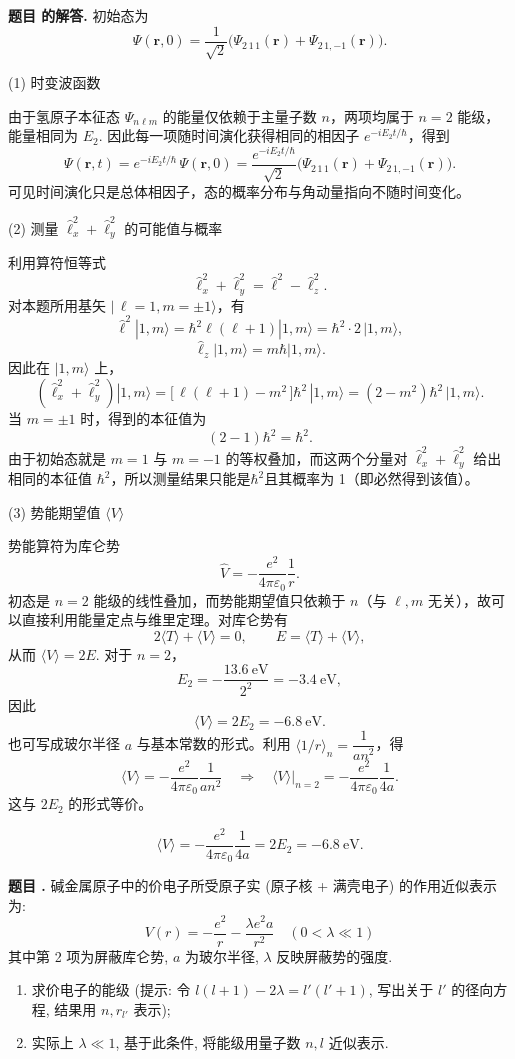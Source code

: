 \documentclass[12pt, a4paper, oneside]{ctexart}
\newcounter{problemname}
\newenvironment{problem}
  {\begin{shaded}\stepcounter{problemname}\par\noindent\textbf{题目 \theproblemname. }}
  {\end{shaded}\par}
\newenvironment{solution}
  {\par\noindent\textbf{题目 \theproblemname 的解答. }}
  {\par}
\begin{document}
\begin{solution}
  初始态为
\[
\Psi(\mathbf r,0)=\frac{1}{\sqrt{2}}\bigl(\Psi_{2\,1\,1}(\mathbf r)+\Psi_{2\,1,-1}(\mathbf r)\bigr).
\]

(1) 时变波函数

由于氢原子本征态 $\Psi_{n\ell m}$ 的能量仅依赖于主量子数 $n$，两项均属于 $n=2$ 能级，能量相同为 $E_2$. 因此每一项随时间演化获得相同的相因子 $e^{-iE_2 t/\hbar}$，得到
\[
\Psi(\mathbf r,t)=e^{-iE_2 t/\hbar}\,\Psi(\mathbf r,0)
=\frac{e^{-iE_2 t/\hbar}}{\sqrt{2}}\bigl(\Psi_{2\,1\,1}(\mathbf r)+\Psi_{2\,1,-1}(\mathbf r)\bigr).
\]
可见时间演化只是总体相因子，态的概率分布与角动量指向不随时间变化。

(2) 测量 $\hat{\ell}_x^2+\hat{\ell}_y^2$ 的可能值与概率

利用算符恒等式
\[
\hat{\ell}_x^2+\hat{\ell}_y^2=\hat{\ell}^2-\hat{\ell}_z^2.
\]
对本题所用基矢 $|\,\ell=1,m=\pm1\rangle$，有
\[
\hat{\ell}^2|1,m\rangle=\hbar^2\ell(\ell+1)|1,m\rangle=\hbar^2\cdot 2\,|1,m\rangle,
\]
\[
\hat{\ell}_z|1,m\rangle=m\hbar|1,m\rangle.
\]
因此在 $|1,m\rangle$ 上，
\[
(\hat{\ell}_x^2+\hat{\ell}_y^2)|1,m\rangle
=\bigl[\,\ell(\ell+1)-m^2\,\bigr]\hbar^2\,|1,m\rangle
=(2-m^2)\hbar^2\,|1,m\rangle.
\]
当 $m=\pm1$ 时，得到的本征值为
\[
(2-1)\hbar^2=\hbar^2.
\]
由于初始态就是 $m=1$ 与 $m=-1$ 的等权叠加，而这两个分量对 $\hat{\ell}_x^2+\hat{\ell}_y^2$ 给出相同的本征值 $\hbar^2$，所以测量结果只能是$\hbar^2$且其概率为 1（即必然得到该值）。

(3) 势能期望值 $\langle V\rangle$

势能算符为库仑势
\[
\hat V=-\frac{e^2}{4\pi\varepsilon_0}\frac{1}{r}.
\]
初态是 $n=2$ 能级的线性叠加，而势能期望值只依赖于 $n$（与 $\ell,m$ 无关），故可以直接利用能量定点与维里定理。对库仑势有
\[
2\langle T\rangle+\langle V\rangle=0,\qquad E=\langle T\rangle+\langle V\rangle,
\]
从而 $\langle V\rangle=2E$. 对于 $n=2$，
\[
E_2=-\frac{13.6\ \mathrm{eV}}{2^2}=-3.4\ \mathrm{eV},
\]
因此
\[
\boxed{\langle V\rangle=2E_2=-6.8\ \mathrm{eV}}.
\]
也可写成玻尔半径 $a$ 与基本常数的形式。利用 $\langle 1/r\rangle_{n}=\dfrac{1}{a n^2}$，得
\[
\langle V\rangle=-\frac{e^2}{4\pi\varepsilon_0}\frac{1}{a n^2}
\quad\Rightarrow\quad
\langle V\rangle\big|_{n=2}=-\frac{e^2}{4\pi\varepsilon_0}\frac{1}{4a}.
\]
这与 $2E_2$ 的形式等价。

\[
\boxed{\langle V\rangle=-\dfrac{e^2}{4\pi\varepsilon_0}\dfrac{1}{4a} = 2E_2 = -6.8\ \mathrm{eV}.}
\]
\end{solution}

\begin{problem}
  碱金属原子中的价电子所受原子实 (原子核 + 满壳电子) 的作用近似表示为:
$$ V(r) = - \frac{e^2}{r} - \frac{\lambda e^2 a}{r^2} \quad (0 < \lambda \ll 1) $$
其中第 2 项为屏蔽库仑势, $a$ 为玻尔半径, $\lambda$ 反映屏蔽势的强度.
\begin{enumerate}
    \item[(1)] 求价电子的能级 (提示: 令 $l(l+1) - 2\lambda = l'(l'+1)$, 写出关于 $l'$ 的径向方程, 结果用 $n, r_{l'}$ 表示);
    \item[(2)] 实际上 $\lambda \ll 1$, 基于此条件, 将能级用量子数 $n, l$ 近似表示.
\end{enumerate}
\end{problem}
\end{document}
